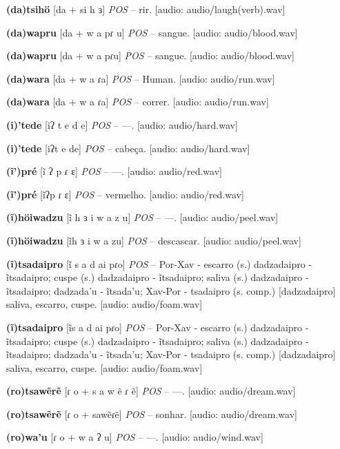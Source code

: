 \textbf{(da)tsihö} [da + si h ɜ] \textit{POS} -- rir. [audio: audio/laugh(verb).wav]{\faHeadphones}

\textbf{(da)wapru} [da + w a pɾ u] \textit{POS} -- sangue. [audio: audio/blood.wav]{\faHeadphones}

\textbf{(da)wapru} [da + w a pɾu] \textit{POS} -- sangue. [audio: audio/blood.wav]{\faHeadphones}

\textbf{(da)wara} [da + w a ɾa] \textit{POS} -- Human. [audio: audio/run.wav]{\faHeadphones}

\textbf{(da)wara} [da + w a ɾa] \textit{POS} -- correr. [audio: audio/run.wav]{\faHeadphones}

\textbf{(i)'tede} [iʔ t e d e] \textit{POS} -- —. [audio: audio/hard.wav]{\faHeadphones}

\textbf{(i)'tede} [iʔt e de] \textit{POS} -- cabeça. [audio: audio/hard.wav]{\faHeadphones}

\textbf{(ĩ')pré} [ĩ ʔ p ɾ ɛ] \textit{POS} -- —. [audio: audio/red.wav]{\faHeadphones}

\textbf{(ĩ')pré} [ĩʔp ɾ ɛ] \textit{POS} -- vermelho. [audio: audio/red.wav]{\faHeadphones}

\textbf{(ĩ)höiwadzu} [ĩ h ɜ i w a z u] \textit{POS} -- —. [audio: audio/peel.wav]{\faHeadphones}

\textbf{(ĩ)höiwadzu} [ĩh ɜ i w a zu] \textit{POS} -- descascar. [audio: audio/peel.wav]{\faHeadphones}

\textbf{(ĩ)tsadaipro} [ĩ s a d ai pɾo] \textit{POS} -- Por-Xav - escarro (s.) dadzadaipro - ĩtsadaipro; cuspe (s.) dadzadaipro - ĩtsadaipro; saliva (s.) dadzadaipro - ĩtsadaipro; dadzada'u - ĩtsada'u; Xav-Por - tsadaipro (s. comp.) [dadzadaipro] saliva, escarro, cuspe. [audio: audio/foam.wav]{\faHeadphones}

\textbf{(ĩ)tsadaipro} [ĩs a d ai pɾo] \textit{POS} -- Por-Xav - escarro (s.) dadzadaipro - ĩtsadaipro; cuspe (s.) dadzadaipro - ĩtsadaipro; saliva (s.) dadzadaipro - ĩtsadaipro; dadzada'u - ĩtsada'u; Xav-Por - tsadaipro (s. comp.) [dadzadaipro] saliva, escarro, cuspe. [audio: audio/foam.wav]{\faHeadphones}

\textbf{(ro)tsawẽrẽ} [ɾ o + s a w ẽ ɾ ẽ] \textit{POS} -- —. [audio: audio/dream.wav]{\faHeadphones}

\textbf{(ro)tsawẽrẽ} [ɾ o + sawẽɾẽ] \textit{POS} -- sonhar. [audio: audio/dream.wav]{\faHeadphones}

\textbf{(ro)wa'u} [ɾ o + w a ʔ u] \textit{POS} -- —. [audio: audio/wind.wav]{\faHeadphones}

